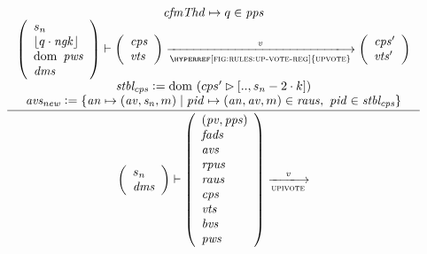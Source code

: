 \begin{figure}[htb]
  \begin{equation}
    \label{eq:rule:upi-vote}
    \inference
    {
      \var{cfmThd} \mapsto q \in \var{pps}\\
      {\left(
        \begin{array}{l}
          s_n\\
          \floor{q \cdot \var{ngk}}\\
          \var{\dom~pws}\\
          \var{dms}
        \end{array}
      \right)}
      \vdash
      {
        \left(
          \begin{array}{l}
            \var{cps}\\
            \var{vts}
          \end{array}
        \right)
      }
      \trans{\hyperref[fig:rules:up-vote-reg]{upvote}}{\var{v}}
      {
        \left(
          \begin{array}{l}
            \var{cps'}\\
            \var{vts'}
          \end{array}
        \right)
      }\\
      \var{stbl_{cps}} \leteq \dom~(cps' \restrictrange [.., s_n - 2 \cdot k])
      \\
      \var{avs_{new}} \leteq \{ \var{an} \mapsto (\var{av}, \var{s_n}, m)
      \mid \var{pid} \mapsto (\var{an}, \var{av}, m) \in \var{raus}
      ,~ \var{pid} \in \var{stbl_{cps}}
      \}
    }
    {
      {\left(
        \begin{array}{l}
          s_n\\
          \var{dms}
        \end{array}
      \right)}
      \vdash
      {
        \left(
          \begin{array}{l}
            (\var{pv}, \var{pps})\\
            \var{fads}\\
            \var{avs}\\
            \var{rpus}\\
            \var{raus}\\
            \var{cps}\\
            \var{vts}\\
            \var{bvs}\\
            \var{pws}
          \end{array}
        \right)
      }
      \trans{upivote}{\var{v}}
}
\end{equation}
\end{figure}
